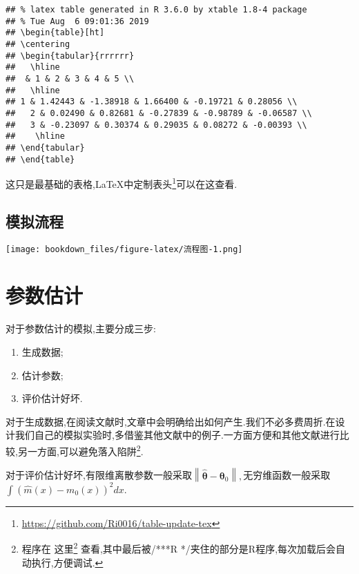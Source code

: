 \documentclass[]{ctexbook}
\providecommand{\tightlist}{%
  \setlength{\itemsep}{0pt}\setlength{\parskip}{0pt}}
\renewcommand{\href}[2]{#2\footnote{\url{#1}}}
\begin{document}
\begin{verbatim}
## % latex table generated in R 3.6.0 by xtable 1.8-4 package
## % Tue Aug  6 09:01:36 2019
## \begin{table}[ht]
## \centering
## \begin{tabular}{rrrrrr}
##   \hline
##  & 1 & 2 & 3 & 4 & 5 \\ 
##   \hline
## 1 & 1.42443 & -1.38918 & 1.66400 & -0.19721 & 0.28056 \\ 
##   2 & 0.02490 & 0.82681 & -0.27839 & -0.98789 & -0.06587 \\ 
##   3 & -0.23097 & 0.30374 & 0.29035 & 0.08272 & -0.00393 \\ 
##    \hline
## \end{tabular}
## \end{table}
\end{verbatim}

这只是最基础的表格,LaTeX中\href{https://github.com/Ri0016/table-update-tex}{定制表头}可以在这查看.

\hypertarget{section-8}{%
\section{模拟流程}\label{section-8}}

\texttt{[image: bookdown\_files/figure-latex/流程图-1.png]}

\hypertarget{section-9}{%
\chapter{参数估计}\label{section-9}}

对于参数估计的模拟,主要分成三步:

\begin{enumerate}
\def\labelenumi{\arabic{enumi}.}
\tightlist
\item
  生成数据;
\item
  估计参数;
\item
  评价估计好坏.
\end{enumerate}

对于生成数据,在阅读文献时,文章中会明确给出如何产生.我们不必多费周折.在设计我们自己的模拟实验时,多借鉴其他文献中的例子.一方面方便和其他文献进行比较,另一方面,可以避免落入陷阱\footnote{程序在 \href{\%22code/Rcpp-demo.cpp\%22}{这里} 查看,其中最后被/***R */夹住的部分是R程序,每次加载后会自动执行,方便调试.}.

对于评价估计好坏,有限维离散参数一般采取\(\left\|\hat{\boldsymbol{\theta}}-\boldsymbol{\theta}_{0}\right\|,\)无穷维函数一般采取\(\int\left(\hat{m}(x)-m_{0}(x)\right)^{2} d x.\)
\end{document}
